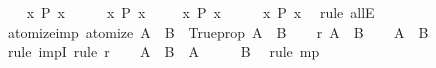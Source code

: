\begin{isabellebody}
%
\isadelimproof
%
\endisadelimproof
%
\isatagproof
{}\isamarkupfalse%
\isanewline
\ \ \isamarkupfalse%
\ {\isachardoublequoteopen}{\isasymAnd}x{\isachardot}{\kern0pt}\ P\ x{\isachardoublequoteclose}\isanewline
\ \ \isamarkupfalse%
\ \isamarkupfalse%
\ {\isachardoublequoteopen}{\isasymforall}x{\isachardot}{\kern0pt}\ P\ x{\isachardoublequoteclose}\ \isacommand{{\isachardot}{\kern0pt}{\isachardot}{\kern0pt}}\isamarkupfalse%
\isanewline
{}\isamarkupfalse%
\isanewline
\ \ \isamarkupfalse%
\ {\isachardoublequoteopen}{\isasymforall}x{\isachardot}{\kern0pt}\ P\ x{\isachardoublequoteclose}\isanewline
\ \ \isamarkupfalse%
\ \isamarkupfalse%
\ {\isachardoublequoteopen}{\isasymAnd}x{\isachardot}{\kern0pt}\ P\ x{\isachardoublequoteclose}\ \isamarkupfalse%
\ {\isacharparenleft}{\kern0pt}rule\ allE{\isacharparenright}{\kern0pt}\isanewline
{}\isamarkupfalse%
%
\endisatagproof
{\isafoldproof}%
%
\isadelimproof
\isanewline
%
\endisadelimproof
\isanewline
{}\isamarkupfalse%
\ atomize{\isacharunderscore}{\kern0pt}imp\ {\isacharbrackleft}{\kern0pt}atomize{\isacharbrackright}{\kern0pt}{\isacharcolon}{\kern0pt}\ {\isachardoublequoteopen}{\isacharparenleft}{\kern0pt}A\ {\isasymLongrightarrow}\ B{\isacharparenright}{\kern0pt}\ {\isasymequiv}\ Trueprop\ {\isacharparenleft}{\kern0pt}A\ {\isasymlongrightarrow}\ B{\isacharparenright}{\kern0pt}{\isachardoublequoteclose}\isanewline
%
\isadelimproof
%
\endisadelimproof
%
\isatagproof
{}\isamarkupfalse%
\isanewline
\ \ \isamarkupfalse%
\ r{\isacharcolon}{\kern0pt}\ {\isachardoublequoteopen}A\ {\isasymLongrightarrow}\ B{\isachardoublequoteclose}\isanewline
\ \ \isamarkupfalse%
\ {\isachardoublequoteopen}A\ {\isasymlongrightarrow}\ B{\isachardoublequoteclose}\ \isamarkupfalse%
\ {\isacharparenleft}{\kern0pt}rule\ impI{\isacharparenright}{\kern0pt}\ {\isacharparenleft}{\kern0pt}rule\ r{\isacharparenright}{\kern0pt}\isanewline
{}\isamarkupfalse%
\isanewline
\ \ \isamarkupfalse%
\ {\isachardoublequoteopen}A\ {\isasymlongrightarrow}\ B{\isachardoublequoteclose}\ \ A\isanewline
\ \ \isamarkupfalse%
\ \isamarkupfalse%
\ B\ \isamarkupfalse%
\ {\isacharparenleft}{\kern0pt}rule\ mp{\isacharparenright}{\kern0pt}\isanewline
{}\isamarkupfalse%
%
\endisatagproof
{\isafoldproof}%
%
\isadelimproof

\end{isabellebody}
